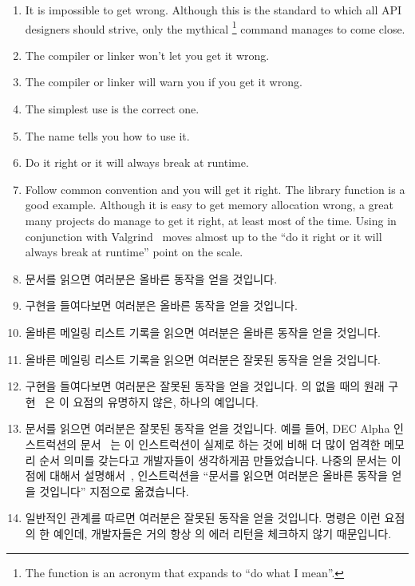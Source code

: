 \begin{enumerate}
\item	It is impossible to get wrong.
	Although this is the standard to which all API designers should
	strive, only the mythical \footnote{
		The  function is an acronym that expands to
		``do what I mean''.}
	command manages to come close.
\item	The compiler or linker won't let you get it wrong.
\item	The compiler or linker will warn you if you get it wrong.
\item	The simplest use is the correct one.
\item	The name tells you how to use it.
\item	Do it right or it will always break at runtime.
\item	Follow common convention and you will get it right.
	The  library function is a good example.
	Although it is easy to get memory allocation wrong, a
	great many projects do manage to get it right, at least most
	of the time.
	Using  in conjunction with
	Valgrind~\cite{ValgrindHomePage} moves 
	almost up to the ``do it right or it will always break at runtime''
	point on the scale.
\fi
\item	문서를 읽으면 여러분은 올바른 동작을 얻을 것입니다.
\item	구현을 들여다보면 여러분은 올바른 동작을 얻을 것입니다.
\item	올바른 메일링 리스트 기록을 읽으면 여러분은 올바른 동작을 얻을 것입니다.
\item	올바른 메일링 리스트 기록을 읽으면 여러분은 잘못된 동작을 얻을 것입니다.
\item	구현을 들여다보면 여러분은 잘못된 동작을 얻을 것입니다.
	 의  없을 때의 원래
	구현~\cite{PaulEMcKenney2007PreemptibleRCU} 은 이 요점의 유명하지 않은,
	하나의 예입니다.
\item	문서를 읽으면 여러분은 잘못된 동작을 얻을 것입니다.
	예를 들어, DEC Alpha  인스트럭션의 문서~\cite{ALPHA95} 는 이
	인스트럭션이 실제로 하는 것에 비해 더 많이 엄격한 메모리 순서 의미를
	갖는다고 개발자들이 생각하게끔 만들었습니다.
	나중의 문서는 이 점에 대해서
	설명해서~\cite{Compaq01,WilliamPugh2000Gharachorloo}, 
	인스트럭션을 ``문서를 읽으면 여러분은 올바른 동작을 얻을 것입니다''
	지점으로 옮겼습니다.
\item	일반적인 관계를 따르면 여러분은 잘못된 동작을 얻을 것입니다.
	 명령은 이런 요점의 한 예인데, 개발자들은 거의 항상
	 의 에러 리턴을 체크하지 않기 때문입니다.
\iffalse


\end{enumerate}

